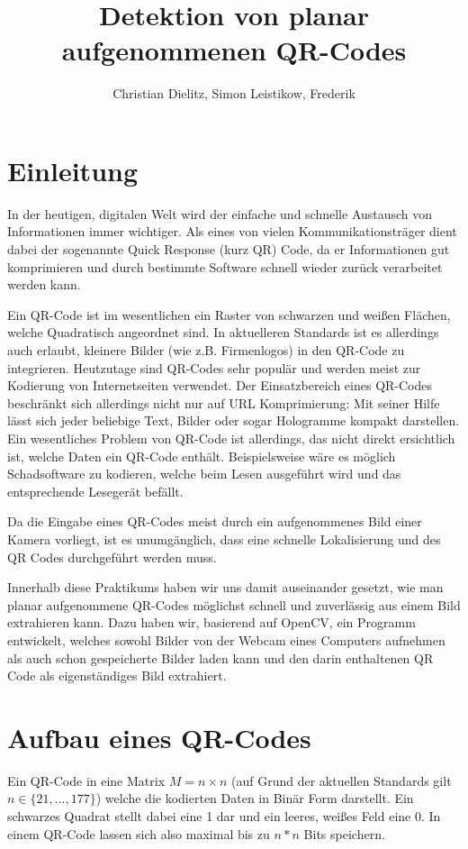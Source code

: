 \documentclass[a4paper, oneside, 12pt]{article}
\title{Detektion von planar aufgenommenen QR-Codes}
\author{Christian Dielitz, Simon Leistikow, Frederik }
\begin{document}
	
	\maketitle
	\newpage
	
	\tableofcontents
	\newpage
	
	\section{Einleitung}
	In der heutigen, digitalen Welt wird der einfache und schnelle Austausch von Informationen immer wichtiger. Als eines von vielen Kommunikationsträger dient dabei der sogenannte Quick Response (kurz QR) Code, da er Informationen gut komprimieren und durch bestimmte Software schnell wieder zurück verarbeitet werden kann.
	
	Ein QR-Code ist im wesentlichen ein Raster von schwarzen und weißen Flächen, welche Quadratisch angeordnet sind. In aktuelleren Standards ist es allerdings auch erlaubt, kleinere Bilder (wie z.B. Firmenlogos) in den QR-Code zu integrieren. Heutzutage sind QR-Codes sehr populär und werden meist zur Kodierung von Internetseiten verwendet. Der Einsatzbereich eines QR-Codes beschränkt sich allerdings nicht nur auf URL Komprimierung: Mit seiner Hilfe lässt sich jeder beliebige Text, Bilder oder sogar Hologramme kompakt darstellen. Ein wesentliches Problem von QR-Code ist allerdings, das nicht direkt ersichtlich ist, welche Daten ein QR-Code enthält. Beispielsweise wäre es möglich Schadsoftware zu kodieren, welche beim Lesen ausgeführt wird und das entsprechende Lesegerät befällt.
	
	Da die Eingabe eines QR-Codes meist durch ein aufgenommenes Bild einer Kamera vorliegt, ist es unumgänglich, dass eine schnelle Lokalisierung und des QR Codes durchgeführt werden muss.
	
	Innerhalb diese Praktikums haben wir uns damit auseinander gesetzt, wie man planar aufgenommene QR-Codes möglichst schnell und zuverlässig aus einem Bild extrahieren kann. Dazu haben wir, basierend auf OpenCV, ein Programm entwickelt, welches sowohl Bilder von der Webcam eines Computers aufnehmen als auch schon gespeicherte Bilder laden kann und den  darin enthaltenen QR Code als eigenständiges Bild extrahiert.
	
	\newpage
	\section{Aufbau eines QR-Codes}
	Ein QR-Code in eine Matrix $M = n \times n$ (auf Grund der aktuellen Standards gilt $n \in \{21,...,177\}$) welche die kodierten Daten in Binär Form darstellt. Ein schwarzes Quadrat stellt dabei eine 1 dar und ein leeres, weißes Feld eine 0. In einem QR-Code lassen sich also maximal bis zu $n*n$ Bits speichern.
	
\end{document}
